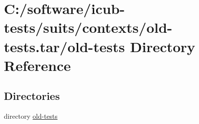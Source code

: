\section{C\+:/software/icub-\/tests/suits/contexts/old-\/tests.tar/old-\/tests Directory Reference}
\label{dir_a8030ebcf4bcb13e456652b57110c13a}
\subsection*{Directories}
\begin{DoxyCompactItemize}
\item 
directory \hyperlink{dir_993e1fa3ddb1ed97768e551ae0127669}{old-\/tests}
\end{DoxyCompactItemize}
